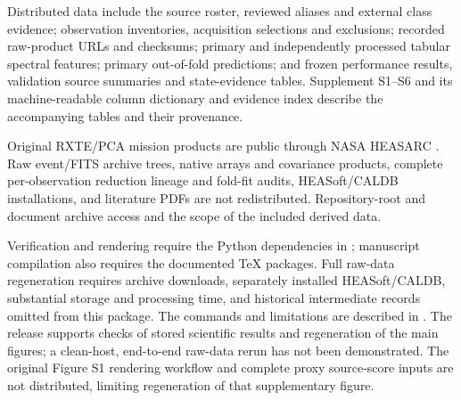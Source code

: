 \documentclass[final,5p,authoryear,nopreprintline]{elsarticle}
\begin{document}
Distributed data include the source roster, reviewed aliases and external class evidence; observation inventories, acquisition selections and exclusions; recorded raw-product URLs and checksums; primary and independently processed tabular spectral features; primary out-of-fold predictions; and frozen performance results, validation source summaries and state-evidence tables. Supplement S1--S6 and its machine-readable column dictionary and evidence index describe the accompanying tables and their provenance.

Original RXTE/PCA mission products are public through NASA HEASARC \citep{NASAStandard}. Raw event/FITS archive trees, native arrays and covariance products, complete per-observation reduction lineage and fold-fit audits, HEASoft/CALDB installations, and literature PDFs are not redistributed. Repository-root  and  document archive access and the scope of the included derived data.

Verification and rendering require the Python dependencies in ; manuscript compilation also requires the documented TeX packages. Full raw-data regeneration requires archive downloads, separately installed HEASoft/CALDB, substantial storage and processing time, and historical intermediate records omitted from this package. The commands and limitations are described in . The release supports checks of stored scientific results and regeneration of the main figures; a clean-host, end-to-end raw-data rerun has not been demonstrated. The original Figure S1 rendering workflow and complete proxy source-score inputs are not distributed, limiting regeneration of that supplementary figure.


\end{document}
